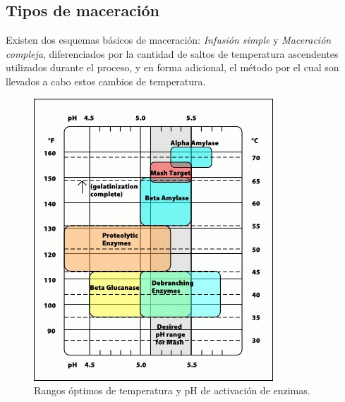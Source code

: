         \subsection{Tipos de maceración}
            \par Existen dos esquemas básicos de maceración: \textit{Infusión simple} y \textit{Maceración compleja}, diferenciados por la cantidad de saltos de temperatura ascendentes utilizados durante el proceso, y en forma adicional, el método por el cual son llevados a cabo estos cambios de temperatura.
            
            \begin{figure} [H]		                                                                    \centerline{\includegraphics[scale=1]{activacion_enzimas_t_ph.jpg}}
                \caption{Rangos óptimos de temperatura y pH de activación de enzimas.}
                \label{ActivacionEnzimasTpH}
            \end{figure}
            
